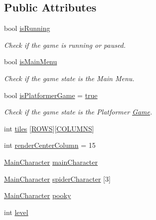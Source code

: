 \subsection*{Public Attributes}
\begin{DoxyCompactItemize}
\item 
bool \mbox{\hyperlink{class_game_adb424734b2454f9ed1e6d6bd44e6dfaf}{is\+Running}}
\begin{DoxyCompactList}\small\item\em Check if the game is running or paused. \end{DoxyCompactList}\item 
bool \mbox{\hyperlink{class_game_a7677fecae8054a7eb350c61dd6c0246a}{is\+Main\+Menu}}
\begin{DoxyCompactList}\small\item\em Check if the game state is the Main Menu. \end{DoxyCompactList}\item 
bool \mbox{\hyperlink{class_game_ac847b4177276b33b3159a59f8ba45f88}{is\+Platformer\+Game}} = \mbox{\hyperlink{ordinals_8h_a41f9c5fb8b08eb5dc3edce4dcb37fee7}{true}}
\begin{DoxyCompactList}\small\item\em Check if the game state is the Platformer \mbox{\hyperlink{class_game}{Game}}. \end{DoxyCompactList}\item 
int \mbox{\hyperlink{class_game_a49404aae4faa4a33d98815cd45662ba0}{tiles}} \mbox{[}\mbox{\hyperlink{_game_8h_a821282c3fbd7714d8302538a5a674885}{R\+O\+WS}}\mbox{]}\mbox{[}\mbox{\hyperlink{_game_8h_af6c484f782f36b472fb334e72c392801}{C\+O\+L\+U\+M\+NS}}\mbox{]}
\item 
int \mbox{\hyperlink{class_game_a7850257252f36f13b0daa694e43e1de9}{render\+Center\+Column}} = 15
\item 
\mbox{\hyperlink{class_main_character}{Main\+Character}} \mbox{\hyperlink{class_game_a037a7a85c51d0d455cfcc3af08542904}{main\+Character}}
\item 
\mbox{\hyperlink{class_main_character}{Main\+Character}} \mbox{\hyperlink{class_game_ad513055bd8c23f50f6b5cf30ed3839c0}{spider\+Character}} \mbox{[}3\mbox{]}
\item 
\mbox{\hyperlink{class_main_character}{Main\+Character}} \mbox{\hyperlink{class_game_a0f428f334dc8a0189d61e9d4a35a43b6}{pooky}}
\item 
int \mbox{\hyperlink{class_game_abe14118bc7cb70c342636c2b2a15554b}{level}}
\end{DoxyCompactItemize}


